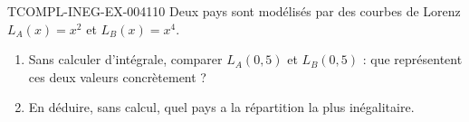 \begin{exercice}{TCOMPL-INEG-EX-004}{1}{10}
Deux pays sont modélisés par des courbes de Lorenz $L_A(x) = x^2$ et $L_B(x) = x^4$.
\begin{enumerate}
  \item Sans calculer d'intégrale, comparer $L_A(0{,}5)$ et $L_B(0{,}5)$ : que représentent ces deux valeurs concrètement ?
  \item En déduire, sans calcul, quel pays a la répartition la plus inégalitaire.
\end{enumerate}
\end{exercice}
